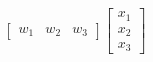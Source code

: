 \documentclass[preview]{standalone}
\begin{document}
\begin{align*}
\begin{bmatrix} w_1 & w_2 & w_3 \end{bmatrix} \begin{bmatrix} x_1 \\ x_2 \\ x_3\end{bmatrix}
\end{align*}
\end{document}

